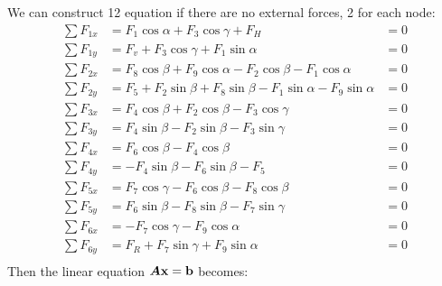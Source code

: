 \documentclass{article}
\begin{document}
We can construct 12 equation if there are no external forces, 2 for each node: 
\begin{align*}
\sum F_{1x} &=F_1\cos\alpha + F_3\cos\gamma+F_H &= 0 \\
\sum F_{1y} &=F_v + F_3\cos\gamma + F_1\sin\alpha &= 0 \\
\sum F_{2x} &=F_8\cos\beta + F_9 \cos\alpha-F_2\cos\beta-F_1\cos\alpha &= 0 \\
\sum F_{2y} &=F_5+F_2\sin\beta+F_8\sin\beta-F_1\sin\alpha-F_9\sin\alpha &= 0 \\
\sum F_{3x} &=F_4\cos\beta+F_2\cos\beta-F_3\cos\gamma &= 0 \\
\sum F_{3y} &=F_4\sin\beta-F_2\sin\beta-F_3\sin\gamma &= 0 \\
\sum F_{4x} &=F_6\cos\beta - F_4\cos\beta &= 0 \\
\sum F_{4y} &=-F_4\sin\beta - F_6\sin\beta-F_5 &=0 \\
\sum F_{5x} &=F_7\cos\gamma - F_6\cos\beta -F_8\cos\beta &= 0 \\
\sum F_{5y} &=F_6\sin\beta-F_8\sin\beta-F_7\sin\gamma &= 0 \\
\sum F_{6x} &=-F_7\cos\gamma-F_9\cos\alpha &= 0 \\
\sum F_{6y} &=F_R+F_7\sin\gamma+F_9\sin\alpha &= 0 \\
\end{align*} 
Then the linear equation $\boldsymbol{A}\boldsymbol{\mathrm{x}}=\boldsymbol{\mathrm{b}}$ becomes: \\
\end{document}
